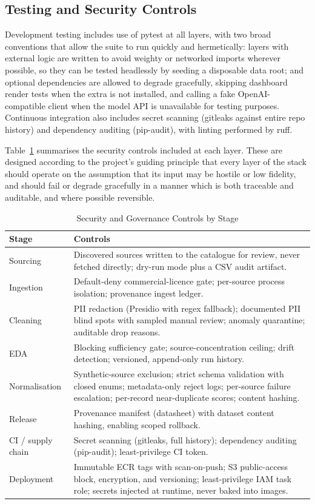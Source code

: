 \documentclass[conference]{IEEEtran}
\begin{document}
\subsection{Testing and Security Controls}

Development testing includes use of pytest at all layers, with two broad conventions that allow the suite to run quickly and hermetically: layers with external logic are written to avoid weighty or networked imports wherever possible, so they can be tested headlessly by seeding a disposable data root; and optional dependencies are allowed to degrade gracefully, skipping dashboard render tests when the extra is not installed, and calling a fake OpenAI-compatible client when the model API is unavailable for testing purposes. Continuous integration also includes secret scanning (gitleaks against entire repo history) and dependency auditing (pip-audit), with linting performed by ruff.

Table~\ref{tab:security} summarises the security controls included at each layer. These are designed according to the project's guiding principle that every layer of the stack should operate on the assumption that its input may be hostile or low fidelity, and should fail or degrade gracefully in a manner which is both traceable and auditable, and where possible reversible.

\begin{table}[t]
\caption{Security and Governance Controls by Stage}
\label{tab:security}
\centering
\renewcommand{\arraystretch}{1.2}
\begin{tabular}{|p{1.3cm}|p{6.1cm}|}
\hline
Stage & Controls \\ \hline
Sourcing & Discovered sources written to the catalogue for review, never fetched directly; dry-run mode plus a CSV audit artifact. \\ \hline
Ingestion & Default-deny commercial-licence gate; per-source process isolation; provenance ingest ledger. \\ \hline
Cleaning & PII redaction (Presidio with regex fallback); documented PII blind spots with sampled manual review; anomaly quarantine; auditable drop reasons. \\ \hline
EDA & Blocking sufficiency gate; source-concentration ceiling; drift detection; versioned, append-only run history. \\ \hline
Normalisation & Synthetic-source exclusion; strict schema validation with closed enums; metadata-only reject logs; per-source failure escalation; per-record near-duplicate scores; content hashing. \\ \hline
Release & Provenance manifest (datasheet) with dataset content hashing, enabling scoped rollback. \\ \hline
CI / supply chain & Secret scanning (gitleaks, full history); dependency auditing (pip-audit); least-privilege CI token. \\ \hline
Deployment & Immutable ECR tags with scan-on-push; S3 public-access block, encryption, and versioning; least-privilege IAM task role; secrets injected at runtime, never baked into images. \\ \hline
\end{tabular}
\end{table}
\end{document}
